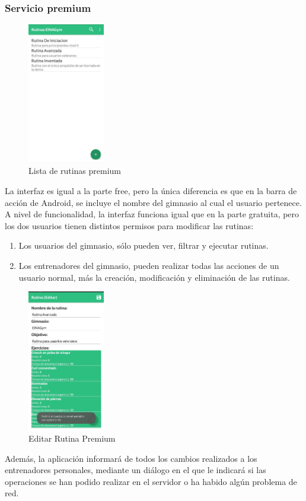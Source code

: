 \documentclass[11pt,a4paper]{report}
\begin{document}
\subsubsection{Servicio premium}
\begin{figure}[H]
	\centering
	\includegraphics[width=0.3\textwidth]{graficos/manual/RutinasPremium.jpg}
	\caption{Lista de rutinas premium}
\end{figure}
La interfaz es igual a la parte free, pero la única diferencia es que en la barra de acción de Android, se incluye el nombre del gimnasio al cual el usuario pertenece.
A nivel de funcionalidad, la interfaz funciona igual que en la parte gratuita, pero los dos usuarios tienen distintos permisos para modificar las rutinas:
\begin{enumerate}
	\item Los usuarios del gimnasio, sólo pueden ver, filtrar y ejecutar rutinas.
	\item Los entrenadores del gimnasio, pueden realizar todas las acciones de un usuario normal, más la creación, modificación y eliminación de las rutinas.
\end{enumerate}
\begin{figure}[H]
	\centering
	\includegraphics[width=0.3\textwidth]{graficos/manual/EditarRutinaPremium.jpg}
	\caption{Editar Rutina Premium}
\end{figure}
Además, la aplicación informará de todos los cambios realizados a los entrenadores personales, mediante un diálogo en el que le indicará si las operaciones se han podido realizar en el servidor o ha habido algún problema de red.
\end{document}
